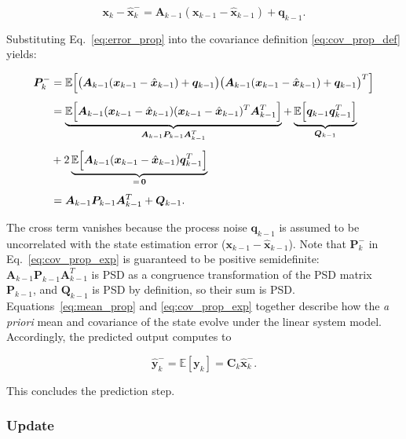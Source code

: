 \begin{equation}
	\bm{x}_{k} - \hat{\bm{x}}_{k}^- 
	= 
	\bm{A}_{k-1} \left( \bm{x}_{k-1} - \hat{\bm{x}}_{k-1} \right) + \bm{q}_{k-1}.
	\label{eq:error_prop}
\end{equation}

Substituting Eq.~\eqref{eq:error_prop} into the covariance definition \eqref{eq:cov_prop_def} yields:

\begin{align}
	\bm{P}_k^- 
	&=
	\mathbb{E}\Big[ 
	\big( \bm{A}_{k-1}(\bm{x}_{k-1}-\hat{\bm{x}}_{k-1}) + \bm{q}_{k-1} \big)
	\big( \bm{A}_{k-1}(\bm{x}_{k-1}-\hat{\bm{x}}_{k-1})	+ \bm{q}_{k-1} \big)^T
	\Big]
	\notag\\[4pt]
	&=
	\underbrace{
		\mathbb{E}\Big[
		\bm{A}_{k-1}
		(\bm{x}_{k-1}-\hat{\bm{x}}_{k-1})
		(\bm{x}_{k-1}-\hat{\bm{x}}_{k-1})^T
		\bm{A}_{k-1}^T
		\Big]
	}_{\bm{A}_{k-1}\bm{P}_{k-1}\bm{A}_{k-1}^T}
	+
	\underbrace{
		\mathbb{E} \Big[ \bm{q}_{k-1}\bm{q}_{k-1}^T \Big]
	}_{\bm{Q}_{k-1}}
	\notag\\[4pt]
	&+
	2\underbrace{
		\mathbb{E}\Big[
		\bm{A}_{k-1}
		(\bm{x}_{k-1}-\hat{\bm{x}}_{k-1})
		\bm{q}_{k-1}^T
		\Big]
	}_{=\,\bm{0}}
	\notag\\[4pt]
	&=
	\bm{A}_{k-1}\bm{P}_{k-1}\bm{A}_{k-1}^T + \bm{Q}_{k-1}	.
	\label{eq:cov_prop_exp}
\end{align}

The cross term vanishes because the process noise $\bm{q}_{k-1}$ is assumed to be uncorrelated with the state estimation error ($\bm{x}_{k-1} - \hat{\bm{x}}_{k-1}$). 
Note that $\bm{P}_k^-$ in Eq.~\eqref{eq:cov_prop_exp} is guaranteed to be positive semidefinite: $\bm{A}_{k-1}\bm{P}_{k-1}\bm{A}_{k-1}^T$ is PSD as a congruence transformation of the PSD matrix $\bm{P}_{k-1}$, and $\bm{Q}_{k-1}$ is PSD by definition, so their sum is PSD.
Equations~\eqref{eq:mean_prop} and \eqref{eq:cov_prop_exp} together describe how the \emph{a priori} mean and covariance of the state evolve under the linear system model.
Accordingly, the predicted output computes to

\begin{equation}
	\hat{\bm{y}}_k^- = \mathbb{E}[{\bm{y}}_k] = \bm{C}_{k} \hat{\bm{x}}_{k}^-.
	\label{eq:predicted_output}
\end{equation}

This concludes the prediction step.





\subsubsection{Update}


